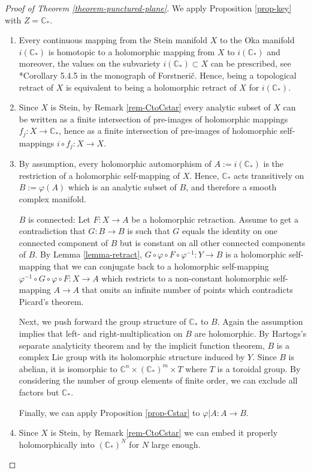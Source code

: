 \documentclass[a4paper,12pt]{amsart}
\newcommand{\CC}{\mathbb{C}}
\theoremstyle{definition}
\begin{document}
\begin{proof}[Proof of Theorem \ref{theorem-punctured-plane}]
We apply Proposition \ref{prop-key} with $Z = \CC_\ast$.
\begin{enumerate}
\item Every continuous mapping from the Stein manifold $X$ to the Oka manifold $i(\CC_\ast)$ is homotopic to a holomorphic mapping from $X$ to $i(\CC_\ast)$ and moreover, the values on the subvariety $i(\CC_\ast) \subset X$ can be prescribed, see \cite{MR3700709}*{Corollary 5.4.5} in the monograph of Forstneri\v{c}. Hence, being a topological retract of $X$ is equivalent to being a holomorphic retract of $X$ for $i(\CC_\ast)$. 
\item Since $X$ is Stein, by Remark \ref{rem-CtoCstar} every analytic subset of $X$ can be written as a finite intersection of pre-images of holomorphic mappings $f_j \colon X \to \CC_\ast$, hence as a finite intersection of pre-images of holomorphic self-mappings $i \circ f_j \colon X \to X$.
\item By assumption, every holomorphic automorphism of $A := i(\CC_\ast)$ is the restriction of a holomorphic self-mapping of $X$. Hence, $\CC_\ast$ acts transitively on $B := \varphi(A)$ which is an analytic subset of $B$, and therefore a smooth complex manifold.

$B$ is connected: Let $F \colon X \to A$ be a holomorphic retraction. Assume to get a contradiction that $G \colon B \to B$ is such that $G$ equals the identity on one connected component of $B$ but is constant on all other connected components of $B$. By Lemma \ref{lemma-retract}, $G \circ \varphi \circ F \circ \varphi^{-1} \colon Y \to B$ is a holomorphic self-mapping that we can conjugate back to a holomorphic self-mapping $\varphi^{-1} \circ G \circ \varphi \circ F \colon X \to A$ which restricts to a non-constant holomorphic self-mapping $A \to A$ that omits an infinite number of points which contradicts Picard's theorem.

Next, we push forward the group structure of $\CC_\ast$ to $B$. Again the assumption implies that left- and right-multiplication on $B$ are holomorphic. By Hartogs's separate analyticity theorem and by the implicit function theorem, $B$ is a complex Lie group with its holomorphic structure induced by $Y$. Since $B$ is abelian, it is isomorphic to $\CC^n \times (\CC_\ast)^m \times T$ where $T$ is a toroidal group. By considering the number of group elements of finite order, we can exclude all factors but $\CC_\ast$.

Finally, we can apply Proposition \ref{prop-Cstar} to $\varphi|A \colon A \to B$.
\item Since $X$ is Stein, by Remark \ref{rem-CtoCstar} we can embed it properly holomorphically into $(\CC_\ast)^N$ for $N$ large enough. \qedhere
\end{enumerate}
\end{proof}
\end{document}
